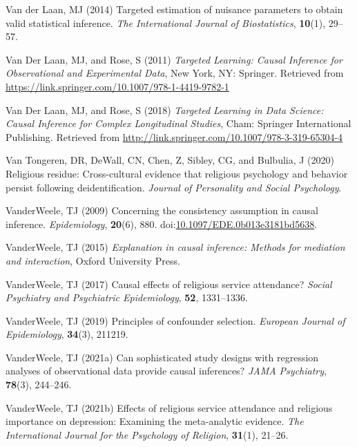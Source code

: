 \documentclass[
  single column]{article}
\newlength{\cslhangindent}
\newenvironment{CSLReferences}[2] %
 {\begin{list}{}{%
  \setlength{\itemindent}{0pt}
  \setlength{\leftmargin}{0pt}
  \setlength{\parsep}{0pt}
  \ifodd #1
   \setlength{\leftmargin}{\cslhangindent}
   \setlength{\itemindent}{-1\cslhangindent}
  \fi
  \setlength{\itemsep}{#2\baselineskip}}}
 {\end{list}}
\begin{document}
\begin{CSLReferences}{1}{0}
Van der Laan, MJ (2014) Targeted estimation of nuisance parameters to
obtain valid statistical inference. \emph{The International Journal of
Biostatistics}, \textbf{10}(1), 29--57.

Van Der Laan, MJ, and Rose, S (2011) \emph{Targeted Learning: Causal
Inference for Observational and Experimental Data}, New York, NY:
Springer. Retrieved from
\url{https://link.springer.com/10.1007/978-1-4419-9782-1}

Van Der Laan, MJ, and Rose, S (2018) \emph{Targeted Learning in Data
Science: Causal Inference for Complex Longitudinal Studies}, Cham:
Springer International Publishing. Retrieved from
\url{http://link.springer.com/10.1007/978-3-319-65304-4}

Van Tongeren, DR, DeWall, CN, Chen, Z, Sibley, CG, and Bulbulia, J
(2020) Religious residue: Cross-cultural evidence that religious
psychology and behavior persist following deidentification.
\emph{Journal of Personality and Social Psychology}.

VanderWeele, TJ (2009) Concerning the consistency assumption in causal
inference. \emph{Epidemiology}, \textbf{20}(6), 880.
doi:\href{https://doi.org/10.1097/EDE.0b013e3181bd5638}{10.1097/EDE.0b013e3181bd5638}.

VanderWeele, TJ (2015) \emph{Explanation in causal inference: Methods
for mediation and interaction}, Oxford University Press.

VanderWeele, TJ (2017) Causal effects of religious service attendance?
\emph{Social Psychiatry and Psychiatric Epidemiology}, \textbf{52},
1331--1336.

VanderWeele, TJ (2019) Principles of confounder selection.
\emph{European Journal of Epidemiology}, \textbf{34}(3), 211219.

VanderWeele, TJ (2021a) Can sophisticated study designs with regression
analyses of observational data provide causal inferences? \emph{JAMA
Psychiatry}, \textbf{78}(3), 244--246.

VanderWeele, TJ (2021b) Effects of religious service attendance and
religious importance on depression: Examining the meta-analytic
evidence. \emph{The International Journal for the Psychology of
Religion}, \textbf{31}(1), 21--26.


\end{CSLReferences}
\end{document}
